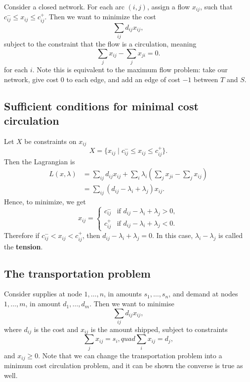\documentclass[12pt]{article}
\theoremstyle{definition}
\theoremstyle{remark}
\begin{document}
Consider a closed network. For each arc $(i, j)$, assign a flow $x_{ij}$, such that $c_{ij}^{-} \leq x_{ij} \leq c_{ij}^{+}$. Then we want to minimize the cost
\[
\sum_{ij} d_{ij} x_{ij}
,\]
subject to the constraint that the flow is a circulation, meaning
\[
\sum_{j}x_{ij} - \sum_{j} x_{ji} = 0
.\]
for each $i$. Note this is equivalent to the maximum flow problem: take our network, give cost $0$ to each edge, and add an edge of cost $-1$ between $T$ and $S$.

\subsection{Sufficient conditions for minimal cost circulation}%
\label{sub:sufficient_conditions_for_minimal_cost_circulation}

Let $X$ be constraints on $x_{ij}$
\[
	X = \{x_{ij} \mid c_{ij}^{-} \leq x_{ij} \leq c_{ij}^{+}\}
.\]
Then the Lagrangian is
\begin{align*}
	L(x, \lambda) &= \sum_{ij}d_{ij}x_{ij} + \sum_{i} \lambda_i \left( \sum_{j} x_{ji} - \sum_{j}x_{ij}\right) \\
		      &= \sum_{ij} (d_{ij} - \lambda_i + \lambda_j)x_{ij}.
\end{align*}
Hence, to minimize, we get
\[
x_{ij} =
\begin{cases}
	c_{ij}^{-} & \text{if } d_{ij} - \lambda_i + \lambda_j > 0, \\
	c_{ij}^{+} & \text{if } d_{ij} - \lambda_i + \lambda_j < 0.
\end{cases}
\]
Therefore if $c_{ij}^{-} < x_{ij} < c_{ij}^{+}$, then $d_{ij} - \lambda_i + \lambda_j = 0$. In this case, $\lambda_i - \lambda_j$ is called the \textbf{tension}.

\subsection{The transportation problem}%
\label{sub:the_transportation_problem}

Consider supplies at node $1, \ldots, n$, in amounts $s_1, \ldots, s_n$, and demand at nodes $1, \ldots, m$, in amount $d_1, \ldots, d_m$. Then we want to minimise
\[
\sum_{ij} d_{ij} x_{ij}
,\]
where $d_{ij}$ is the cost and $x_{ij}$ is the amount shipped, subject to constraints
\[
\sum_{j} x_{ij} = s_i, quad \sum_{i}x_{ij} = d_j
,\]
and $x_{ij} \geq 0$. Note that we can change the transportation problem into a minimum cost circulation problem, and it can be shown the converse is true as well.
\end{document}
